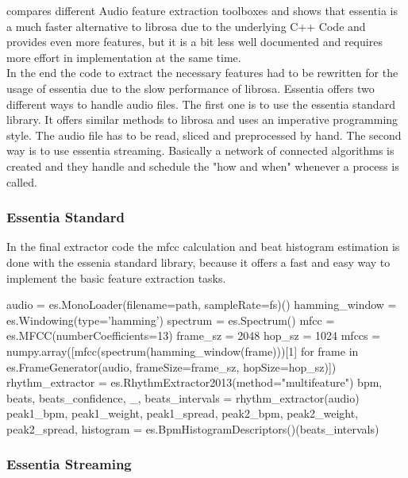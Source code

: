 \cite{audiofeattoolb} compares different Audio feature extraction toolboxes and shows that essentia is a much faster alternative to librosa due to the underlying C++ Code and provides even more features, but it is a bit less well documented and requires more effort in implementation at the same time.\\ 
In the end the code to extract the necessary features had to be rewritten for the usage of essentia due to the slow performance of librosa. Essentia offers two different ways to handle audio files. The first one is to use the essentia standard library. It offers similar methods to librosa and uses an imperative programming style. The audio file has to be read, sliced and preprocessed by hand. 
The second way is to use essentia streaming. Basically a network of connected algorithms is created and they handle and schedule the "how and when" whenever a process is called.

\subsubsection{Essentia Standard}

In the final extractor code the mfcc calculation and beat histogram estimation is done with the essenia standard library, because it offers a fast and easy way to implement the basic feature extraction tasks. 
\begin{pythonCode}
audio = es.MonoLoader(filename=path, sampleRate=fs)()
hamming_window = es.Windowing(type='hamming')
spectrum = es.Spectrum()
mfcc = es.MFCC(numberCoefficients=13)
frame_sz = 2048
hop_sz = 1024
mfccs = numpy.array([mfcc(spectrum(hamming_window(frame)))[1] 
	for frame in es.FrameGenerator(audio, frameSize=frame_sz, hopSize=hop_sz)])
rhythm_extractor = es.RhythmExtractor2013(method="multifeature")
bpm, beats, beats_confidence, _, beats_intervals = rhythm_extractor(audio)
peak1_bpm, peak1_weight, peak1_spread, peak2_bpm, peak2_weight, peak2_spread, histogram =
	es.BpmHistogramDescriptors()(beats_intervals)
\end{pythonCode}

\subsubsection{Essentia Streaming}

